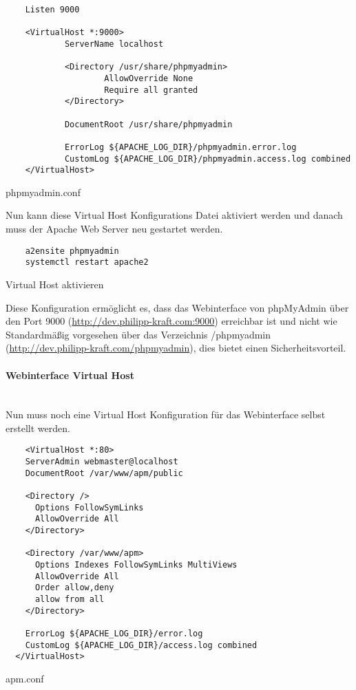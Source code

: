 \begin{listing}[H]
  \begin{verbatim}
    Listen 9000

    <VirtualHost *:9000>
            ServerName localhost
    
            <Directory /usr/share/phpmyadmin>
                    AllowOverride None
                    Require all granted
            </Directory>
    
            DocumentRoot /usr/share/phpmyadmin
    
            ErrorLog ${APACHE_LOG_DIR}/phpmyadmin.error.log
            CustomLog ${APACHE_LOG_DIR}/phpmyadmin.access.log combined
    </VirtualHost>
  \end{verbatim}
  \caption{phpmyadmin.conf}
\end{listing}

Nun kann diese Virtual Host Konfigurations Datei aktiviert werden und danach
muss der Apache Web Server neu gestartet werden.

\begin{listing}[H]
  \begin{verbatim}
    a2ensite phpmyadmin
    systemctl restart apache2
  \end{verbatim}
  \caption{Virtual Host aktivieren}
\end{listing}

Diese Konfiguration
ermöglicht es, dass das Webinterface von phpMyAdmin über den Port 9000 (\url{http://dev.philipp-kraft.com:9000})
erreichbar ist und nicht wie Standardmäßig vorgesehen über das Verzeichnis
/phpmyadmin (\url{http://dev.philipp-kraft.com/phpmyadmin}), dies bietet einen Sicherheitsvorteil.

\paragraph{Webinterface Virtual Host}\mbox{}\\

Nun muss noch eine Virtual Host Konfiguration für das Webinterface selbst erstellt werden.

\begin{listing}[H]
  \begin{verbatim}
    <VirtualHost *:80>
    ServerAdmin webmaster@localhost
    DocumentRoot /var/www/apm/public
          
    <Directory />
      Options FollowSymLinks
      AllowOverride All
    </Directory>
  
    <Directory /var/www/apm>
      Options Indexes FollowSymLinks MultiViews
      AllowOverride All
      Order allow,deny
      allow from all
    </Directory>
  
    ErrorLog ${APACHE_LOG_DIR}/error.log
    CustomLog ${APACHE_LOG_DIR}/access.log combined
  </VirtualHost>
  \end{verbatim}
  \caption{apm.conf}
\end{listing}

